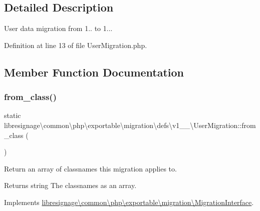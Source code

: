 \subsection{Detailed Description}
User data migration from 1.. to 1... 

Definition at line 13 of file User\+Migration.\+php.



\subsection{Member Function Documentation}
\mbox{\label{classlibresignage_1_1common_1_1php_1_1exportable_1_1migration_1_1defs_1_1v1__0__0_1_1UserMigration_a560c453a9befc1eb97308e0d91183f35}} 
\subsubsection{\texorpdfstring{from\+\_\+class()}{from\_class()}}
{\footnotesize\ttfamily static libresignage\textbackslash{}common\textbackslash{}php\textbackslash{}exportable\textbackslash{}migration\textbackslash{}defs\textbackslash{}v1\+\_\+\_\textbackslash{}\+User\+Migration\+::from\+\_\+class (\begin{DoxyParamCaption}{ }\end{DoxyParamCaption})\hspace{0.3cm}{\ttfamily [static]}}

Return an array of classnames this migration applies to.

\begin{DoxyReturn}{Returns}
string The classnames as an array. 
\end{DoxyReturn}


Implements \hyperlink{interfacelibresignage_1_1common_1_1php_1_1exportable_1_1migration_1_1MigrationInterface_aa8eb2e4ff59358ae551061687540f724}{libresignage\textbackslash{}common\textbackslash{}php\textbackslash{}exportable\textbackslash{}migration\textbackslash{}\+Migration\+Interface}.



